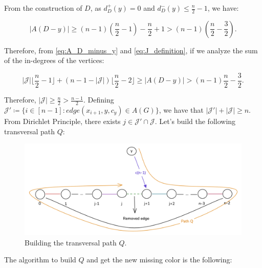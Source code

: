 From the construction of $D$, as $d^+_D(y) = 0$ and $d^-_D(y) \leq \frac{n}{2} - 1$, we have:

\begin{equation}
    |A(D - y)| \geq (n - 1) (\frac{n}{2} - 1) - \frac{n}{2} + 1 > (n - 1) (\frac{n}{2} - \frac{3}{2}).
    \label{eq:A_D_minus_y}
\end{equation}

Therefore, from \ref{eq:A_D_minus_y} and \ref{eq:J_definition}, if we analyze
the sum of the in-degrees of the vertices:

\begin{equation}
    |\mathcal{J}| \lfloor \frac{n}{2} - 1 \rfloor + (n - 1 - |\mathcal{J}|) \lfloor \frac{n}{2} - 2 \rfloor \geq |A(D - y)| > (n - 1) \frac{n}{2} - \frac{3}{2}.
\end{equation}

Therefore, $|\mathcal{J}| \geq \frac{n}{2} > \frac{n - 1}{2}$. Defining 
$\mathcal{J}' \coloneqq \{i \in [n - 1]: edge(x_{i+1}, y, c_y) \in A(G)\}$, we have that 
$|\mathcal{J}'| + |\mathcal{J}| \geq n$. From Dirichlet Principle, there exists 
$j \in \mathcal{J}' \cap \mathcal{J}$. Let's build the following transversal path $Q$:

\begin{figure}[H]
    \centering
    \includegraphics[width=1\textwidth]{figuras/cycle_n-1_path_q.png}
    \caption{Building the transversal path $Q$.}
    \label{fig:cycle_n-1_path_q}
\end{figure}

The algorithm to build $Q$ and get the new missing color is the following:


